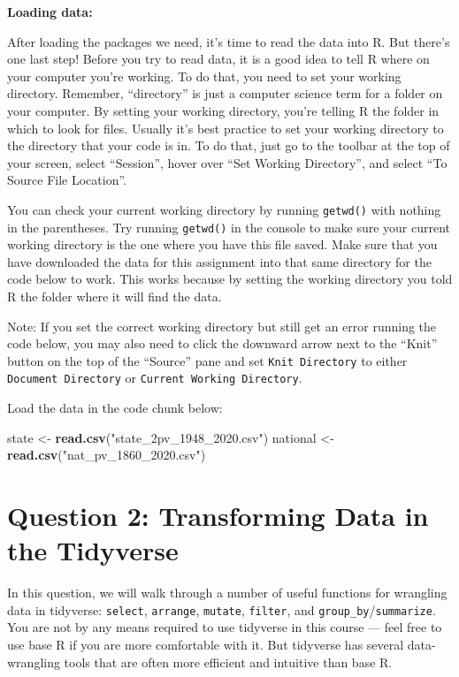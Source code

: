 \documentclass[
]{article}
\newenvironment{Shaded}{\begin{snugshade}}{\end{snugshade}}
\newcommand{\FunctionTok}[1]{\textcolor[rgb]{0.13,0.29,0.53}{\textbf{#1}}}
\newcommand{\NormalTok}[1]{#1}
\newcommand{\OtherTok}[1]{\textcolor[rgb]{0.56,0.35,0.01}{#1}}
\newcommand{\StringTok}[1]{\textcolor[rgb]{0.31,0.60,0.02}{#1}}
\begin{document}
\textbf{Loading data:}

After loading the packages we need, it's time to read the data into R.
But there's one last step! Before you try to read data, it is a good
idea to tell R where on your computer you're working. To do that, you
need to set your working directory. Remember, ``directory'' is just a
computer science term for a folder on your computer. By setting your
working directory, you're telling R the folder in which to look for
files. Usually it's best practice to set your working directory to the
directory that your code is in. To do that, just go to the toolbar at
the top of your screen, select ``Session'', hover over ``Set Working
Directory'', and select ``To Source File Location''.

You can check your current working directory by running \texttt{getwd()}
with nothing in the parentheses. Try running \texttt{getwd()} in the
console to make sure your current working directory is the one where you
have this file saved. Make sure that you have downloaded the data for
this assignment into that same directory for the code below to work.
This works because by setting the working directory you told R the
folder where it will find the data.

Note: If you set the correct working directory but still get an error
running the code below, you may also need to click the downward arrow
next to the ``Knit'' button on the top of the ``Source'' pane and set
\texttt{Knit\ Directory} to either \texttt{Document\ Directory} or
\texttt{Current\ Working\ Directory}.

Load the data in the code chunk below:

\begin{Shaded}
\begin{Highlighting}[]
\NormalTok{state }\OtherTok{\textless{}{-}} \FunctionTok{read.csv}\NormalTok{(}\StringTok{"state\_2pv\_1948\_2020.csv"}\NormalTok{)}
\NormalTok{national }\OtherTok{\textless{}{-}} \FunctionTok{read.csv}\NormalTok{(}\StringTok{"nat\_pv\_1860\_2020.csv"}\NormalTok{)}
\end{Highlighting}
\end{Shaded}

\section{Question 2: Transforming Data in the
Tidyverse}\label{question-2-transforming-data-in-the-tidyverse}

In this question, we will walk through a number of useful functions for
wrangling data in tidyverse: \texttt{select}, \texttt{arrange},
\texttt{mutate}, \texttt{filter}, and
\texttt{group\_by}/\texttt{summarize}. You are not by any means required
to use tidyverse in this course --- feel free to use base R if you are
more comfortable with it. But tidyverse has several data-wrangling tools
that are often more efficient and intuitive than base R.
\end{document}
